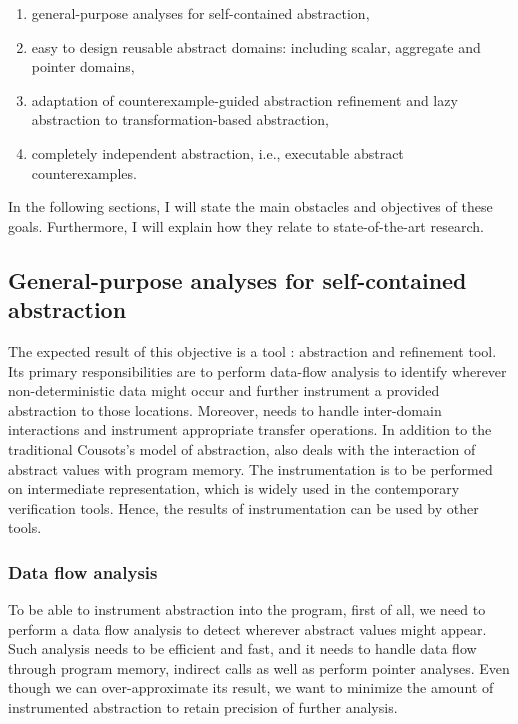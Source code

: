 \begin{enumerate}
    \item general-purpose analyses for self-contained abstraction,
    \item easy to design reusable abstract domains: including scalar, aggregate
        and pointer domains,
    \item adaptation of counterexample-guided abstraction refinement and
        lazy abstraction to transformation-based abstraction,
    \item completely independent abstraction, i.e., executable abstract counterexamples.
\end{enumerate}

\noindent
In the following sections, I will state the main obstacles and objectives of
these goals. Furthermore, I will explain how they relate to state-of-the-art
research.

\subsection{General-purpose analyses for self-contained abstraction}

The expected result of this objective is a tool \lart: \llvm abstraction and
refinement tool. Its primary responsibilities are to perform data-flow analysis
to identify wherever non-deterministic data might occur and further instrument
a provided abstraction to those locations. Moreover, \lart needs to handle
inter-domain interactions and instrument appropriate transfer operations. In
addition to the traditional Cousots's model of abstraction, \lart also deals
with the interaction of abstract values with program memory. The
instrumentation is to be performed on \llvm intermediate representation, which
is widely used in the contemporary verification tools. Hence, the results of
instrumentation can be used by other tools.

\subsubsection{Data flow analysis}

To be able to instrument abstraction into the program, first of all, we need to
perform a data flow analysis to detect wherever abstract values might appear.
Such analysis needs to be efficient and fast, and it needs to handle data flow
through program memory, indirect calls as well as perform pointer analyses. Even though we can
over-approximate its result, we want to minimize the amount of instrumented
abstraction to retain precision of further analysis.


